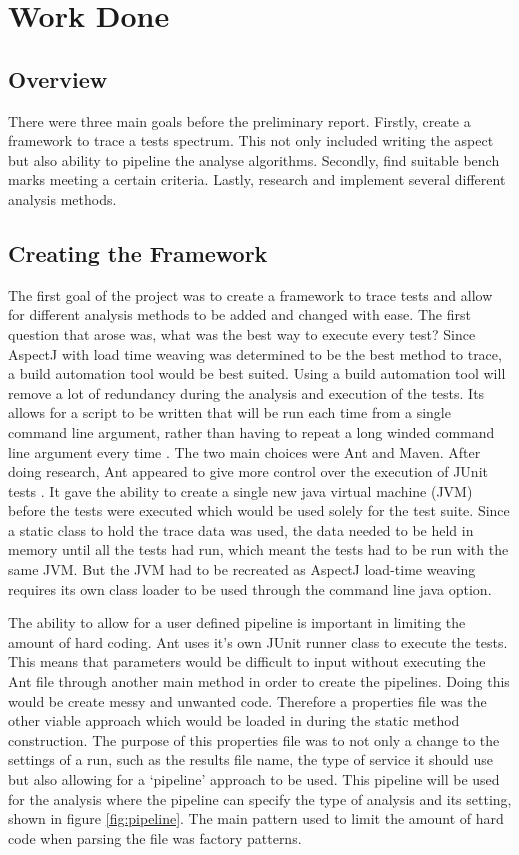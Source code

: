 \chapter{Work Done}\label{C:workdone}

\section{Overview}
There were three main goals before the preliminary report. Firstly, create a framework to trace a tests spectrum. This not only included writing the aspect but also ability to pipeline the analyse algorithms. Secondly, find suitable bench marks meeting a certain criteria. Lastly, research and implement several different analysis methods.

\section{Creating the Framework}

The first goal of the project was to create a framework to trace tests and allow for different analysis methods to be added and changed with ease. The first question that arose was, what was the best way to execute every test? Since AspectJ with load time weaving was determined to be the best method to trace, a build automation tool would be best suited. Using a build automation tool will remove a lot of redundancy during the analysis and execution of the tests. Its allows for a script to be written that will be run each time from a single command line argument, rather than having to repeat a long winded command line argument every time . The two main choices were Ant and Maven. After doing research, Ant appeared to give more control over the execution of JUnit tests \cite{antjunit} \cite{mavenjunit}. It gave the ability to create a single new java virtual machine (JVM) before the tests were executed which would be used solely for the test suite. Since a static class to hold the trace data was used, the data needed to be held in memory until all the tests had run, which meant the tests had to be run with the same JVM. But the JVM had to be recreated as AspectJ load-time weaving requires its own class loader to be used through the command line java option. 

The ability to allow for a user defined pipeline is important in limiting the amount of hard coding. Ant uses it’s own JUnit runner class to execute the tests. This means that parameters would be difficult to input without executing the Ant file through another main method in order to create the pipelines. Doing this would be create messy and unwanted code. Therefore a properties file was the other viable approach which would be loaded in during the static method construction. The purpose of this properties file was to not only a change to the settings of a run, such as the results file name, the type of service it should use but also allowing for a ‘pipeline’ approach to be used. This pipeline will be used for the analysis where the pipeline can specify the type of analysis and its setting, shown in figure \ref{fig:pipeline}. The main pattern used to limit the amount of hard code when parsing the file was factory patterns. 

